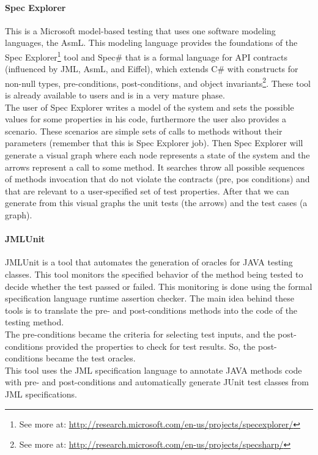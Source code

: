\paragraph{Spec Explorer}
This is a Microsoft model-based testing that uses one software modeling languages, the \ac{AsmL}.
This modeling language provides the foundations of the Spec Explorer\footnote{See more at: \url{http://research.microsoft.com/en-us/projects/specexplorer/}} tool
and Spec\# that is a formal language for \ac{API} contracts (influenced by \ac{JML}, \ac{AsmL}, and Eiffel), which extends C\# with constructs for non-null types,
pre-conditions, post-conditions, and object invariants\footnote{See more at: \url{http://research.microsoft.com/en-us/projects/specsharp/}}.
These tool is already available to users and is in a very mature phase.\\
\indent The user of Spec Explorer writes a model of the system and sets the possible values for some properties in his code, furthermore the user also provides a scenario.
These scenarios are simple sets of calls to methods without their parameters (remember that this is Spec Explorer job).
Then Spec Explorer will generate a visual graph where each node represents a state of the system and the arrows represent a call to some method.
It searches throw all possible sequences of methods invocation that do not violate the contracts (pre, pos conditions) and
that are relevant to a user-specified set of test properties. After that we can generate from this visual graphs the unit tests (the arrows) and the
test cases (a graph).

\paragraph{JMLUnit}
JMLUnit\cite{Cheon04thejml} is a tool that automates the generation of oracles for JAVA testing classes. This tool
monitors the specified behavior of the method being tested to decide whether the test passed or failed.
This monitoring is done using the formal specification language runtime assertion checker.
The main idea behind these tools is to translate the pre- and post-conditions methods into the code of the testing method.\\
The pre-conditions became the criteria for selecting test inputs, and the post-conditions provided the properties to check for
test results. So, the post-conditions became the test oracles.\\
This tool uses the \ac{JML}\cite{Burdy03anoverview} specification language to annotate JAVA methods code with pre- and post-conditions and
automatically generate JUnit test classes from \ac{JML} specifications.

